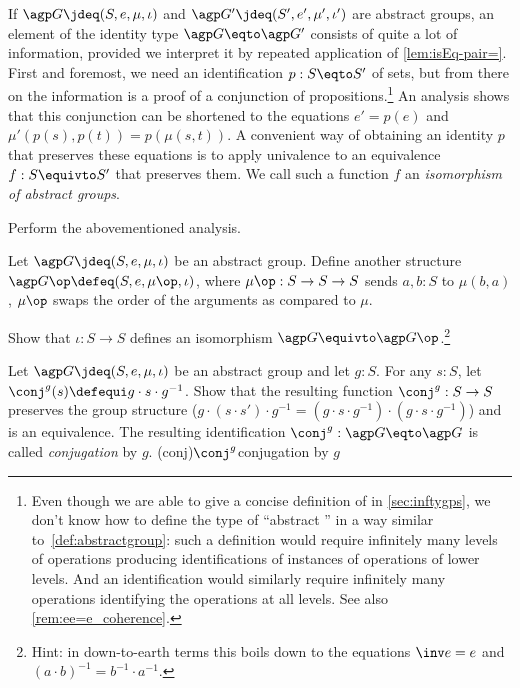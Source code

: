 \begin{remark}\label{rem:abs-iso}
  If $\agp G\jdeq (S,e,\mu,\iota)$ and $\agp G'\jdeq(S',e',\mu',\iota')$
  are abstract groups, an element of the identity type
  $\agp G\eqto\agp G'$ consists of quite a lot of information,
  provided we interpret it by repeated application of \cref{lem:isEq-pair=}.
  First and foremost, we need an identification $p:S\eqto S'$ of sets, but
  from there on the information is a proof of a conjunction of propositions.\footnote{%
    \label{ft:no-abs-inftygp}
    Even though we are able to give a concise definition of \inftygps 
    in \cref{sec:inftygps}, we don't know how to define
    the type of ``abstract \inftygps'' in a way similar
    to~\cref{def:abstractgroup}:
    such a definition would require infinitely many 
    levels of operations producing
    identifications of instances of operations of lower levels.
    And an identification would similarly require infinitely
    many operations identifying the operations at all levels.
    See also \cref{rem:ee=e_coherence}.}
  An analysis shows that this conjunction can be shortened to the equations $e'=p(e)$ and
  $\mu'(p(s),p(t))=p(\mu(s,t))$.  A convenient way of obtaining an 
  identity $p$ that preserves these equations is to apply univalence to an
  equivalence $f: S \equivto S'$ that preserves them.
  We call such a function $f$ an \emph{isomorphism of abstract groups}.%
\end{remark}

\begin{xca}
  Perform the abovementioned analysis.
\end{xca}

\begin{xca}
  \label{xca:op-abs-group}
  Let $\agp G \jdeq (S,e,\mu,\iota)$ be an abstract group.
  Define another structure $\agp G\op \defeq (S,e,\mu\op,\iota)$,
  where $\mu\op : S \to S \to S$ sends $a,b:S$ to $\mu(b,a)$,
  \ie $\mu\op$ swaps the order of the arguments as compared to $\mu$.

  Show that $\iota : S \to S$ defines an isomorphism 
  $\agp G \equivto \agp G\op$.\footnote{%
  Hint: in down-to-earth terms this boils down to the equations
  $\inv e = e$ and $(a\cdot b)^{-1} = b^{-1}\cdot a^{-1}$.}
\end{xca}

\begin{xca}
  \label{xca:conj}
  Let $\agp G\jdeq(S,e,\mu,\iota)$ be an abstract group and let $g:S$.  
  For any $s:S$, let $\conj^g(s)\defequi g\cdot s\cdot g^{-1}$. 
  Show that the resulting function $\conj^g:S\to S$ preserves the group 
  structure (\eg $g\cdot(s\cdot s')\cdot g^{-1}=(g\cdot s\cdot g^{-1} )\cdot(g\cdot s\cdot g^{-1})$) and is an equivalence.  The resulting identification $\conj^g:\agp G\eqto\agp G$ is called \emph{conjugation} by $g$.
\glossary(conj){$\protect\conj^g$}{conjugation by $g$}
\end{xca}

